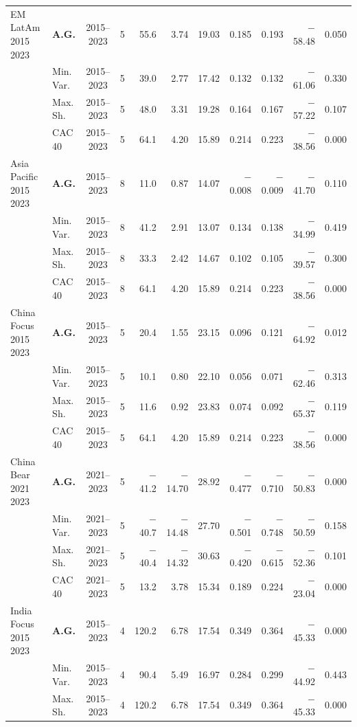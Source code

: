 \begin{longtable}{p{2.6cm} l c c r r r r r r r}
\midrule
EM LatAm 2015 2023 & \textbf{A.G.} & 2015--2023 & 5 & 55.6 & 3.74 & 19.03 & 0.185 & 0.193 & $-$58.48 & 0.050 \\
 & Min.\,Var. & 2015--2023 & 5 & 39.0 & 2.77 & 17.42 & 0.132 & 0.132 & $-$61.06 & 0.330 \\
 & Max.\,Sh. & 2015--2023 & 5 & 48.0 & 3.31 & 19.28 & 0.164 & 0.167 & $-$57.22 & 0.107 \\
 & CAC 40 & 2015--2023 & 5 & 64.1 & 4.20 & 15.89 & 0.214 & 0.223 & $-$38.56 & 0.000 \\
\midrule
Asia Pacific 2015 2023 & \textbf{A.G.} & 2015--2023 & 8 & 11.0 & 0.87 & 14.07 & $-$0.008 & $-$0.009 & $-$41.70 & 0.110 \\
 & Min.\,Var. & 2015--2023 & 8 & 41.2 & 2.91 & 13.07 & 0.134 & 0.138 & $-$34.99 & 0.419 \\
 & Max.\,Sh. & 2015--2023 & 8 & 33.3 & 2.42 & 14.67 & 0.102 & 0.105 & $-$39.57 & 0.300 \\
 & CAC 40 & 2015--2023 & 8 & 64.1 & 4.20 & 15.89 & 0.214 & 0.223 & $-$38.56 & 0.000 \\
\midrule
China Focus 2015 2023 & \textbf{A.G.} & 2015--2023 & 5 & 20.4 & 1.55 & 23.15 & 0.096 & 0.121 & $-$64.92 & 0.012 \\
 & Min.\,Var. & 2015--2023 & 5 & 10.1 & 0.80 & 22.10 & 0.056 & 0.071 & $-$62.46 & 0.313 \\
 & Max.\,Sh. & 2015--2023 & 5 & 11.6 & 0.92 & 23.83 & 0.074 & 0.092 & $-$65.37 & 0.119 \\
 & CAC 40 & 2015--2023 & 5 & 64.1 & 4.20 & 15.89 & 0.214 & 0.223 & $-$38.56 & 0.000 \\
\midrule
China Bear 2021 2023 & \textbf{A.G.} & 2021--2023 & 5 & $-$41.2 & $-$14.70 & 28.92 & $-$0.477 & $-$0.710 & $-$50.83 & 0.000 \\
 & Min.\,Var. & 2021--2023 & 5 & $-$40.7 & $-$14.48 & 27.70 & $-$0.501 & $-$0.748 & $-$50.59 & 0.158 \\
 & Max.\,Sh. & 2021--2023 & 5 & $-$40.4 & $-$14.32 & 30.63 & $-$0.420 & $-$0.615 & $-$52.36 & 0.101 \\
 & CAC 40 & 2021--2023 & 5 & 13.2 & 3.78 & 15.34 & 0.189 & 0.224 & $-$23.04 & 0.000 \\
\midrule
India Focus 2015 2023 & \textbf{A.G.} & 2015--2023 & 4 & 120.2 & 6.78 & 17.54 & 0.349 & 0.364 & $-$45.33 & 0.000 \\
 & Min.\,Var. & 2015--2023 & 4 & 90.4 & 5.49 & 16.97 & 0.284 & 0.299 & $-$44.92 & 0.443 \\
 & Max.\,Sh. & 2015--2023 & 4 & 120.2 & 6.78 & 17.54 & 0.349 & 0.364 & $-$45.33 & 0.000 \\

\end{longtable}
